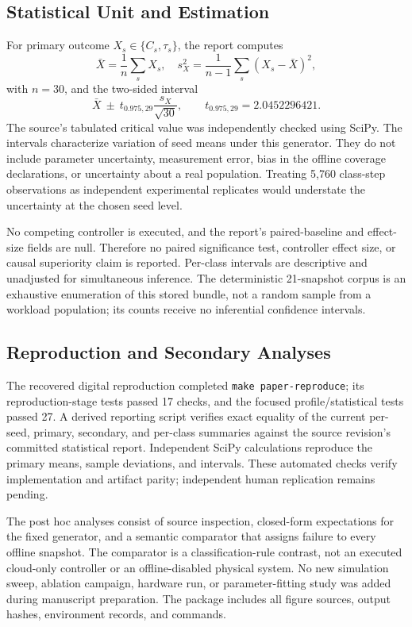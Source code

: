 \subsection{Statistical Unit and Estimation}
For primary outcome $X_s\in\{C_s,\tau_s\}$, the report computes
\begin{equation}
\bar X=\frac1n\sum_s X_s,\quad
s_X^2=\frac1{n-1}\sum_s(X_s-\bar X)^2,\label{eq:stats}
\end{equation}
with $n=30$, and the two-sided interval
\begin{equation}
\bar X\ \pm\ t_{0.975,29}\frac{s_X}{\sqrt{30}},\qquad
 t_{0.975,29}=2.0452296421.\label{eq:ci}
\end{equation}
The source's tabulated critical value was independently checked using SciPy. The intervals characterize variation of seed means under this generator. They do not include parameter uncertainty, measurement error, bias in the offline coverage declarations, or uncertainty about a real population. Treating 5,760 class-step observations as independent experimental replicates would understate the uncertainty at the chosen seed level.

No competing controller is executed, and the report's paired-baseline and effect-size fields are null. Therefore no paired significance test, controller effect size, or causal superiority claim is reported. Per-class intervals are descriptive and unadjusted for simultaneous inference. The deterministic 21-snapshot corpus is an exhaustive enumeration of this stored bundle, not a random sample from a workload population; its counts receive no inferential confidence intervals.

\subsection{Reproduction and Secondary Analyses}
The recovered digital reproduction completed \texttt{make paper-reproduce}; its reproduction-stage tests passed 17 checks, and the focused profile/statistical tests passed 27. A derived reporting script verifies exact equality of the current per-seed, primary, secondary, and per-class summaries against the source revision's committed statistical report. Independent SciPy calculations reproduce the primary means, sample deviations, and intervals. These automated checks verify implementation and artifact parity; independent human replication remains pending.

The post hoc analyses consist of source inspection, closed-form expectations for the fixed generator, and a semantic comparator that assigns failure to every offline snapshot. The comparator is a classification-rule contrast, not an executed cloud-only controller or an offline-disabled physical system. No new simulation sweep, ablation campaign, hardware run, or parameter-fitting study was added during manuscript preparation. The package includes all figure sources, output hashes, environment records, and commands.

